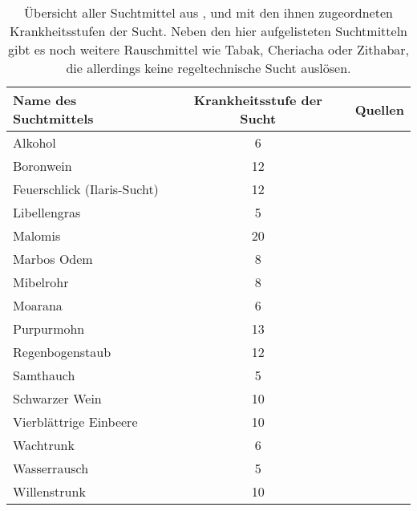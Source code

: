\begin{table}
	\centering
	\caption[Suchtmittel aus ,  und ]{Übersicht aller Suchtmittel aus ,  und  mit den ihnen zugeordneten Krankheitsstufen der Sucht. Neben den hier aufgelisteten Suchtmitteln gibt es noch weitere Rauschmittel wie Tabak, Cheriacha oder Zithabar, die allerdings keine regeltechnische Sucht auslösen. \cite[S.~271]{WdH}\label{tbl-suchtmittel}}
	\begin{tabular}{lcr}
		\toprule
		{Name des Suchtmittels} & {Krankheitsstufe der Sucht} & {Quellen} \\
		\hline
		Alkohol & 6 & \cite[S.~271]{WdH} \\
		Boronwein & 12 & \cite[S.~271]{WdH}\cite[S.~272]{ZBA} \\
		Feuerschlick (Ilaris-Sucht) & 12 & \cite[S.~237]{ZBA} \\
		Libellengras & 5 & \cite[S.~194]{WdA} \\
		Malomis & 20 & \cite[S.~248]{ZBA} \\
		Marbos Odem & 8 & \cite[S.~271]{WdH}\cite[S.~247]{ZBA} \\
		Mibelrohr & 8 & \cite[S.~251]{ZBA} \\
		Moarana & 6 & \cite[S.~271]{WdH}\cite[S.~201]{ZBA} \\
		Purpurmohn & 13 & \cite[S.~253]{ZBA} \\
		Regenbogenstaub & 12 & \cite[S.~63]{WdA} \\
		Samthauch & 5 & \cite[S.~271]{WdH}\cite[S.~266]{ZBA} \\
		Schwarzer Wein & 10 & \cite[S.~271]{WdH} \\
		Vierblättrige Einbeere & 10 & \cite[S.~271]{ZBA} \\
		Wachtrunk & 6 & \cite[S.~64]{WdA} \\
		Wasserrausch & 5 & \cite[S.~273]{ZBA} \\
		Willenstrunk & 10 & \cite[S.~43/44]{WdA} \\
		\bottomrule
	\end{tabular}
\end{table}
